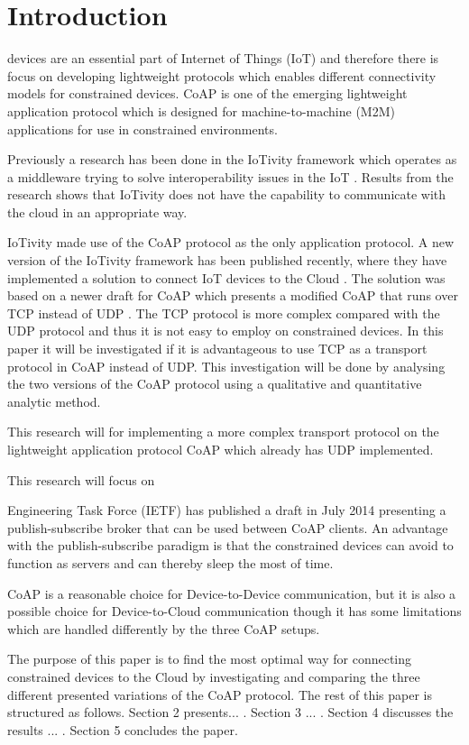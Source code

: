 \section{Introduction}
% 
% 
 devices are an essential part of Internet of Things (IoT) and therefore there is focus on developing lightweight protocols which enables different connectivity models for constrained devices.  
CoAP is one of the emerging lightweight application protocol which is designed for machine-to-machine (M2M) applications for use in constrained environments.   

Previously a research has been done in the IoTivity framework which operates as a middleware trying to solve interoperability issues in the IoT \cite{interoperabilityChallenge}. Results from the research shows that IoTivity does not have the capability to communicate with the cloud in an appropriate way. 

IoTivity made use of the CoAP protocol as the only application protocol. 
A new version of the IoTivity framework has been published recently, where they have implemented a solution to connect IoT devices to the Cloud \cite{iotivity1.1}. The solution was based on a newer draft for CoAP \cite{coapTCP} which presents a modified CoAP that runs over TCP instead of UDP \cite{coapUDP}.
The TCP protocol is more complex compared with the UDP protocol and thus it is not easy to employ on constrained devices. In this paper it will be investigated if it is advantageous to use TCP as a transport protocol in CoAP instead of UDP. This investigation will be done by analysing the two versions of the CoAP protocol using a qualitative and quantitative analytic method.


This research will  for implementing a more complex transport protocol on the lightweight application protocol CoAP which already has UDP implemented.

This research will focus on 

Engineering Task Force (IETF) has published a draft in July 2014 presenting a publish-subscribe broker that can be used between CoAP clients. An advantage with the publish-subscribe paradigm is that the constrained devices can avoid to function as servers and can thereby sleep the most of time.

CoAP is a reasonable choice for Device-to-Device communication,  but it is also a possible choice for Device-to-Cloud communication though it has some limitations which are handled differently by the three CoAP setups.

The purpose of this paper is to find the most optimal way for connecting constrained devices to the Cloud by investigating and comparing the three different presented variations of the CoAP protocol. The rest of this paper is structured as follows.  Section 2 presents... . Section 3 ... . Section 4 discusses the results ... . Section 5 concludes the paper.     
